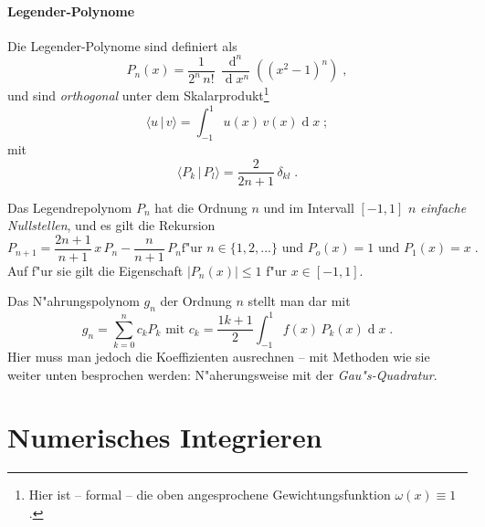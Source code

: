 \documentclass[a4paper]{book}
\newcommand{\diff}{\ensuremath{\operatorname d}}
\begin{document}
\subsubsection{Legender-Polynome}
\label{sec:legender_polynome}


Die Legender-Polynome sind definiert als
\begin{equation}
  \label{eq:51}
  P_n(x) = \frac{1}{2^n \, n!} \, \frac{\diff ^n}{\diff x^n} \left (
    (x^2 - 1)^n \right ) \;,
\end{equation}
und sind \emph{orthogonal} unter dem Skalarprodukt\footnote{Hier ist
  -- formal -- die oben angesprochene Gewichtungsfunktion $\omega(x)
  \equiv 1$.}
\begin{equation}
  \label{eq:52}
\langle u \,|\, v \rangle = \int_{-1}^1
  u(x)\,v(x) \diff x \;;
\end{equation}
mit
\begin{equation}
  \label{eq:53}
  \langle P_k \,|\, P_l  \rangle = \frac{2}{2n+1} \, \delta_{kl} \;.
\end{equation}

Das Legendrepolynom $P_n$ hat die Ordnung $n$ und im Intervall
$[-1,1]$ $n$ \emph{einfache Nullstellen}, und es gilt die Rekursion
\begin{equation}
  \label{eq:54}
  P_{n+1} = \frac{2n+1}{n+1} \, x\, P_n - \frac{n}{n+1} \, P_n \text{
    f"ur } n \in \{1,2,...\} \text{ und } P_o(x) =1 \text{ und }
  P_1(x) = x \;.
\end{equation}
Auf f"ur sie gilt die Eigenschaft $| P_n (x) | \leq 1$ f"ur $x \in
[-1,1]$.

Das N"ahrungspolynom $g_n$ der Ordnung $n$ stellt man dar mit
\begin{equation}
  \label{eq:55}
  g_n = \sum_{k=0}^n c_k P_k \text{ mit } c_k = \frac{1k+1}{2}
  \int_{-1}^1 f(x) \, P_k(x) \diff x \;.
\end{equation}
Hier muss man jedoch die Koeffizienten ausrechnen -- mit Methoden wie
sie weiter unten besprochen werden: N"aherungsweise mit der
\emph{Gau"s-Quadratur}.






















\chapter{Numerisches Integrieren}
\label{sec:numer_integr}
\end{document}

